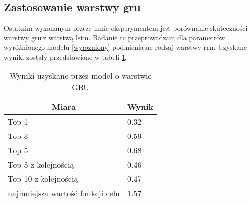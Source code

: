 \subsection{Zastosowanie warstwy gru}
Ostatnim wykonanym przeze mnie eksperymentem jest porównanie skuteczności warstwy gru z warstwą lstm. Badanie to przeprowadzam 
dla parametrów wyróżnionego modelu \ref{wyrozniony} podmieniając rodzaj warstwy rnn. Uzyskane wyniki zostały przedstawione w tabeli \ref{wyniki_gru}. 
\begin{table}[ht]
    \centering
    \begin{tabular}{|l|l|}
        \hline
        \multicolumn{1}{|c|}{Miara}  & Wynik\\ \hline
        Top 1                            & 0.32 \\ \hline
        Top 3                            & 0.59 \\ \hline
        Top 5                            & 0.68 \\ \hline
        Top 5 z kolejnością              & 0.46 \\ \hline
        Top 10 z kolejnością             & 0.47 \\ \hline
        najmniejsza wartość funkcji celu & 1.57 \\ \hline
        \end{tabular}
    \caption{Wyniki uzyskane przez model o warstwie GRU} 

    \label{wyniki_gru}
\end{table} \\ 

